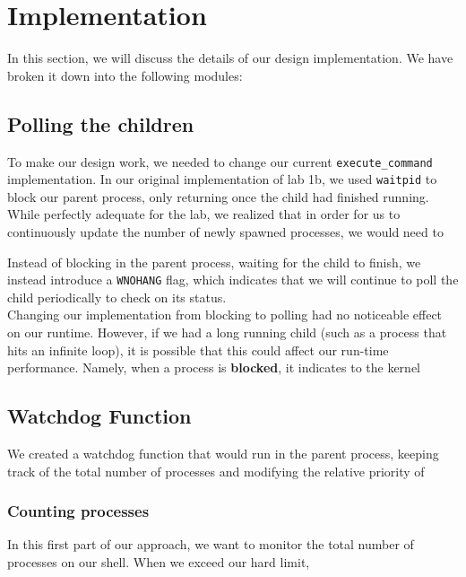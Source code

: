 \documentclass{article}
\begin{document}


\section{Implementation}
In this section, we will discuss the details of our design implementation. We
have broken it down into the following modules:
\subsection{Polling the children}
To make our design work, we needed to change our current \verb+execute_command+
implementation. In our original implementation of lab 1b, we used 
\verb+waitpid+ to block our parent process, only returning once the child had
finished running. While perfectly adequate for the lab, we realized that in 
order for us to continuously update the number of newly spawned processes, we
would need to 

Instead of blocking in the parent process, waiting for the
child to finish, we instead introduce a \verb+WNOHANG+ flag, which indicates
that we will continue to poll the child periodically to check on its status. \\
Changing our implementation from blocking to polling had no noticeable effect
on our runtime. However, if we had a long running child (such as a process that
hits an infinite loop), it is possible that this could affect our run-time 
performance. Namely, when a process is \textbf{blocked}, it indicates to the 
kernel 
\subsection{Watchdog Function}
We created a watchdog function that would run in the parent process, keeping
track of the total number of processes and modifying the relative priority of

\subsubsection{Counting processes}
In this first part of our approach, we want to monitor the total number of
processes on our shell. When we exceed our hard limit, 
\end{document}
